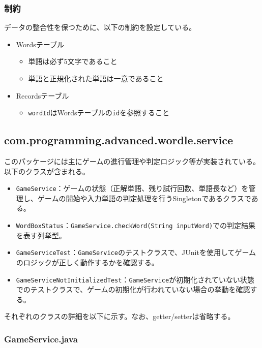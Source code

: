 \documentclass[a4j]{ujarticle}
\begin{document}
\subsubsection{制約}
データの整合性を保つために、以下の制約を設定している。
\begin{itemize}
  \item Wordsテーブル
  \begin{itemize}
    \item 単語は必ず5文字であること
    \item 単語と正規化された単語は一意であること
  \end{itemize}
  \item Recordsテーブル
  \begin{itemize}
    \item \texttt{wordId}はWordsテーブルの\texttt{id}を参照すること
  \end{itemize}
\end{itemize}

\subsection{com.programming.advanced.wordle.service}
このパッケージには主にゲームの進行管理や判定ロジック等が実装されている。以下のクラスが含まれる。
\begin{itemize}
  \item \texttt{GameService}：ゲームの状態（正解単語、残り試行回数、単語長など）を管理し、ゲームの開始や入力単語の判定処理を行うSingletonであるクラスである。
  \item \texttt{WordBoxStatus}：\texttt{GameService.checkWord(String inputWord)}での判定結果を表す列挙型。
  \item \texttt{GameServiceTest}：\texttt{GameService}のテストクラスで、JUnitを使用してゲームのロジックが正しく動作するかを確認する。
  \item \texttt{GameServiceNotInitializedTest}：\texttt{GameService}が初期化されていない状態でのテストクラスで、ゲームの初期化が行われていない場合の挙動を確認する。
\end{itemize}

それぞれのクラスの詳細を以下に示す。なお、getter/setterは省略する。
\subsubsection{GameService.java}
\end{document}

